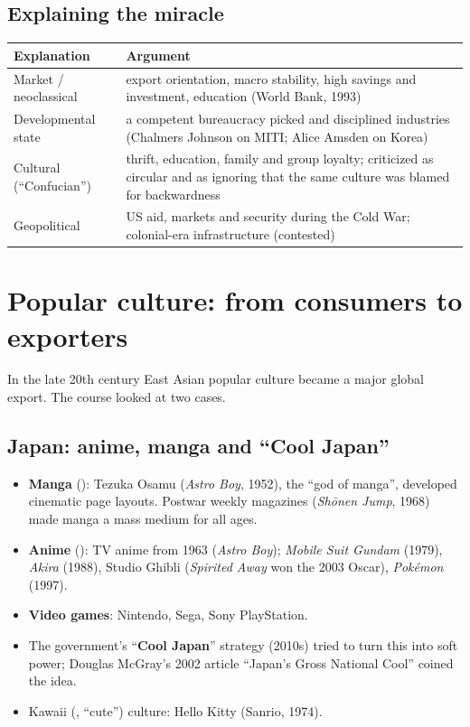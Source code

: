 \subsection{Explaining the miracle}

\begin{center}
\begin{tabular}{p{4cm}p{9cm}}
\toprule
Explanation & Argument \\
\midrule
Market / neoclassical & export orientation, macro stability, high savings and investment, education (World Bank, 1993) \\
Developmental state & a competent bureaucracy picked and disciplined industries (Chalmers Johnson on MITI; Alice Amsden on Korea) \\
Cultural (``Confucian'') & thrift, education, family and group loyalty; criticized as circular and as ignoring that the same culture was blamed for backwardness \\
Geopolitical & US aid, markets and security during the Cold War; colonial-era infrastructure (contested) \\
\bottomrule
\end{tabular}
\end{center}

\section{Popular culture: from consumers to exporters}

In the late 20th century East Asian popular culture became a major global export. The
course looked at two cases.

\subsection{Japan: anime, manga and ``Cool Japan''}

\begin{itemize}
  \item \textbf{Manga} (): Tezuka Osamu (\emph{Astro Boy}, 1952), the ``god of
        manga'', developed cinematic page layouts. Postwar weekly magazines (\emph{Shōnen
        Jump}, 1968) made manga a mass medium for all ages.
  \item \textbf{Anime} (): TV anime from 1963 (\emph{Astro Boy}); \emph{Mobile
        Suit Gundam} (1979), \emph{Akira} (1988), Studio Ghibli (\emph{Spirited Away} won
        the 2003 Oscar), \emph{Pokémon} (1997).
  \item \textbf{Video games}: Nintendo, Sega, Sony PlayStation.
  \item The government's ``\textbf{Cool Japan}'' strategy (2010s) tried to turn this into
        soft power; Douglas McGray's 2002 article ``Japan's Gross National Cool'' coined the
        idea.
  \item Kawaii (, ``cute'') culture: Hello Kitty (Sanrio, 1974).
\end{itemize}

